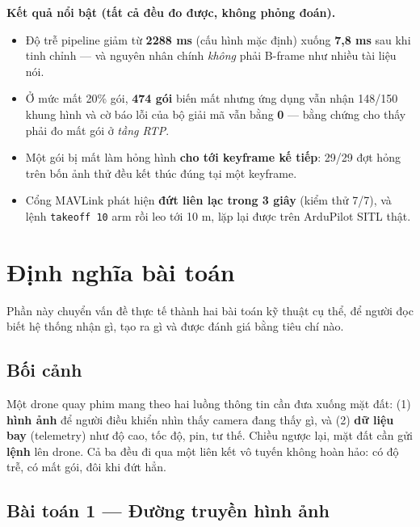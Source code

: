 \documentclass[12pt]{ai_conquer2026}
\begin{document}
\textbf{Kết quả nổi bật (tất cả đều đo được, không phỏng đoán).}

\begin{itemize}
\item Độ trễ pipeline giảm từ \textbf{2288 ms} (cấu hình mặc định) xuống
      \textbf{7,8 ms} sau khi tinh chỉnh --- và nguyên nhân chính \emph{không}
      phải B-frame như nhiều tài liệu nói.
\item Ở mức mất 20\% gói, \textbf{474 gói} biến mất nhưng ứng dụng vẫn nhận
      148/150 khung hình và cờ báo lỗi của bộ giải mã vẫn bằng \textbf{0} ---
      bằng chứng cho thấy phải đo mất gói ở \emph{tầng RTP}.
\item Một gói bị mất làm hỏng hình \textbf{cho tới keyframe kế tiếp}: 29/29 đợt
      hỏng trên bốn ảnh thử đều kết thúc đúng tại một keyframe.
\item Cổng MAVLink phát hiện \textbf{đứt liên lạc trong 3 giây} (kiểm thử 7/7),
      và lệnh \texttt{takeoff 10} arm rồi leo tới 10 m, lặp lại được trên
      ArduPilot SITL thật.
\end{itemize}

\newpage
\setcounter{tocdepth}{2}
\tableofcontents
\thispagestyle{fancy}

\newpage
\section{Định nghĩa bài toán}

Phần này chuyển vấn đề thực tế thành hai bài toán kỹ thuật cụ thể, để người đọc
biết hệ thống nhận gì, tạo ra gì và được đánh giá bằng tiêu chí nào.

\subsection{Bối cảnh}

Một drone quay phim mang theo hai luồng thông tin cần đưa xuống mặt đất: (1)
\textbf{hình ảnh} để người điều khiển nhìn thấy camera đang thấy gì, và (2)
\textbf{dữ liệu bay} (telemetry) như độ cao, tốc độ, pin, tư thế. Chiều ngược
lại, mặt đất cần gửi \textbf{lệnh} lên drone. Cả ba đều đi qua một liên kết vô
tuyến không hoàn hảo: có độ trễ, có mất gói, đôi khi đứt hẳn.

\subsection{Bài toán 1 --- Đường truyền hình ảnh}
\end{document}
